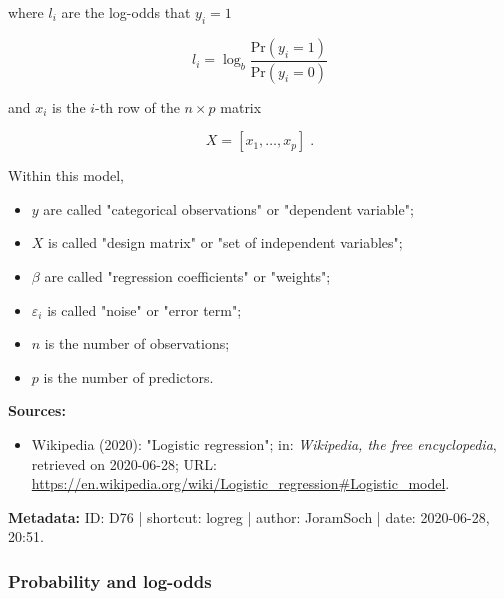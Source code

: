 \documentclass[a4paper,12pt,twoside]{book}
\begin{document}
where $l_i$ are the log-odds that $y_i = 1$

\begin{equation} \label{eq:logreg-logodds}
l_i = \log_b \frac{\mathrm{Pr}(y_i = 1)}{\mathrm{Pr}(y_i = 0)}
\end{equation}

and $x_i$ is the $i$-th row of the $n \times p$ matrix

\begin{equation} \label{eq:logreg-X}
X = \left[ x_1, \ldots, x_p \right] \; .
\end{equation}

Within this model,

\begin{itemize}

\item $y$ are called "categorical observations" or "dependent variable";

\item $X$ is called "design matrix" or "set of independent variables";

\item $\beta$ are called "regression coefficients" or "weights";

\item $\varepsilon_i$ is called "noise" or "error term";

\item $n$ is the number of observations;

\item $p$ is the number of predictors.

\end{itemize}


\vspace{1em}
\textbf{Sources:}
\begin{itemize}
\item Wikipedia (2020): "Logistic regression"; in: \textit{Wikipedia, the free encyclopedia}, retrieved on 2020-06-28; URL: \url{https://en.wikipedia.org/wiki/Logistic_regression#Logistic_model}.
\end{itemize}


\vspace{1em}
\textbf{Metadata:} ID: D76 | shortcut: logreg | author: JoramSoch | date: 2020-06-28, 20:51.
\vspace{1em}



\subsubsection[\textbf{Probability and log-odds}]{Probability and log-odds} \label{sec:logreg-pnlo}
\setcounter{equation}{0}
\end{document}
